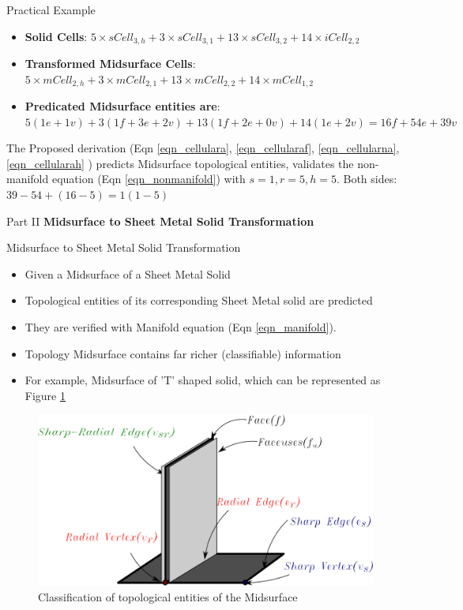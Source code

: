 \begin{frame}{Practical Example}
\begin{center}
{}
\end{center}
\begin{itemize}[noitemsep,label=\textbullet,topsep=2pt,parsep=2pt,partopsep=2pt]
	\item \textbf {Solid Cells}: \newline  $5 \times sCell_{3,h} + 3 \times sCell_{3,1} + 13 \times sCell_{3,2} + 14 \times iCell_{2,2} $
	\item \textbf {Transformed Midsurface Cells}: \newline $5 \times mCell_{2,h} + 3 \times mCell_{2,1} + 13 \times mCell_{2,2} + 14 \times mCell_{1,2}$
	\item \textbf {Predicated Midsurface entities are}:  \newline $5(1e+1v) + 3 (1f+3e+2v) + 13 (1f+2e+0v) + 14(1e+2v) = 
16f + 54e + 39v$
\end{itemize}
The Proposed derivation (Eqn   \ref{eqn_cellulara}, \ref{eqn_cellularaf}, \ref{eqn_cellularna}, \ref{eqn_cellularah} ) predicts Midsurface topological entities, validates the non-manifold equation (Eqn \ref{eqn_nonmanifold}) with $s=1, r=5, h=5$. Both sides: $ 39 - 54 + (16 -5) = 1 (1-5)$

\end{frame}

\begin{frame}{Part II}
\centering \textbf{\Large Midsurface to Sheet Metal Solid Transformation}
\end{frame}

\begin{frame}{Midsurface to Sheet Metal Solid Transformation}
\begin{itemize}[noitemsep,label=\textbullet,topsep=2pt,parsep=2pt,partopsep=2pt]
\item Given a Midsurface of a Sheet Metal Solid
\item Topological entities  of its corresponding Sheet Metal solid are predicted
\item They are verified with Manifold equation (Eqn \ref{eqn_manifold}).
\item Topology Midsurface contains far richer (classifiable) information 
\item For example, Midsurface of 'T' shaped solid, which can be represented as Figure \ref{fig_nonmanifold}
\end{itemize}

\begin{figure}[htbp]
\begin{center}
\includegraphics[width=0.4\linewidth]{../Common/images/NonManifoldT1.pdf} 
\end{center}
\caption{Classification of topological entities of the Midsurface}
\label{fig_nonmanifold}
\end{figure}
\end{frame}


